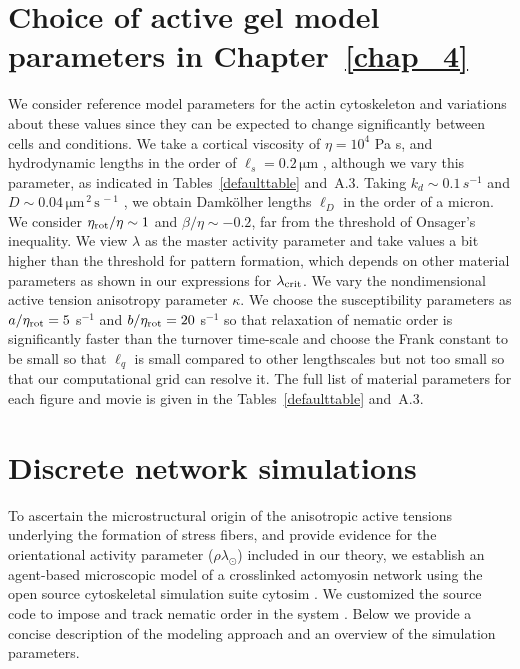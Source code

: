 \section{Choice of active gel model parameters in Chapter~\ref{chap_4}} \label{appendix_1_sec_7}

We consider reference model parameters for the actin cytoskeleton and variations about these values since they can be expected to change significantly between cells and conditions. We take a cortical viscosity of $\eta = 10^4$ Pa s, and hydrodynamic lengths in the order of $\ell_s = 0.2\,  \si{\micro \meter}$ \cite{salbreux2009, hannezo2015}, although we vary this parameter, as indicated in Tables~\ref{defaulttable} and~A.3. Taking $k_d \sim 0.1 \,  \si{s}^{-1}$ \cite{callan2008, hannezo2015, yolland2019} and $D \sim 0.04 \,  \si{\micro \meter}^{\, 2} \,  \si{\second}^{\, -1}$ \cite{yolland2019, hannezo2015}, we obtain Damk\"olher lengths $\ell_D$ in the order of a micron. We consider $\eta_{\rm rot} / \eta \sim 1$  and $\beta / \eta \sim -0.2$, far from the threshold of Onsager's inequality. We view $\lambda$ as the master activity parameter and take values a bit higher than the threshold for pattern formation, which depends on other material parameters as shown in our expressions for $\lambda_{\rm crit}$. We vary the nondimensional active tension anisotropy parameter  $\kappa$. We choose the susceptibility parameters as $a/\eta_{\rm rot} = 5$ s$^{-1}$ and $b/\eta_{\rm rot} = 20$ s$^{-1}$ so that relaxation of nematic order is significantly faster than the turnover time-scale and choose the Frank constant to be small so that $\ell_q$ is small compared to other lengthscales but not too small so that our computational grid can resolve it. The full list of material parameters for each figure and movie is given in the Tables~\ref{defaulttable} and~A.3.

\section{\label{sec:level1} Discrete network simulations} \label{appendix_1_sec_8}

To ascertain the microstructural origin of the anisotropic active tensions underlying the formation of stress fibers, and provide evidence for the orientational activity parameter ($\rho \lambda_{\odot}$) included in our theory, we establish an agent-based microscopic model of a crosslinked actomyosin network using the open source cytoskeletal simulation suite cytosim \cite{Nedelec2007,cytosimGitHub}. We customized the source code to impose and track nematic order in the system \cite{pensalfini2022_cytosim}.  Below we provide a concise description of the modeling approach and an overview of the simulation parameters.

